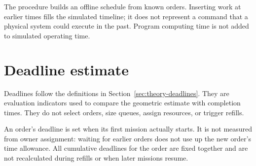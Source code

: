 \begin{nota}
    The procedure builds an offline schedule from known orders. Inserting work
    at earlier times fills the simulated timeline; it does not represent a
    command that a physical system could execute in the past. Program computing
    time is not added to simulated operating time.
\end{nota}

\section{Deadline estimate}
\label{sec:stima-deadline-euclidea}
\label{sec:stima-deadline-manhattan} %

Deadlines follow the definitions in Section~\ref{sec:theory-deadlines}.
They are evaluation indicators used to compare the geometric estimate with
completion times. They do not select orders, size queues, assign resources,
or trigger refills.

An order's deadline is set when its first mission actually starts. It is not
measured from owner assignment: waiting for earlier orders does not use up the
new order's time allowance. All cumulative deadlines for the order are fixed
together and are not recalculated during refills or when later missions resume.

